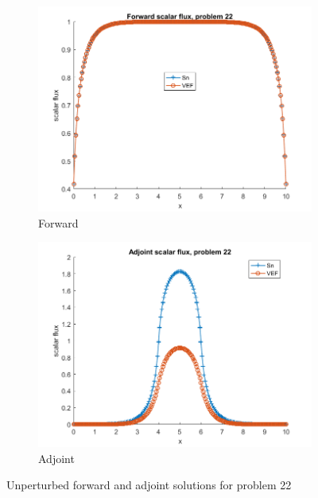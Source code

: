 \documentclass{article}
\begin{document}
\begin{figure}[H]
\centering
\begin{subfigure}{.5\textwidth}
  \centering
  \includegraphics[width=1\linewidth]{p22f.png}
  \caption{Forward}
  \label{fig:sub1}
\end{subfigure}%
\begin{subfigure}{.5\textwidth}
  \centering
  \includegraphics[width=1\linewidth]{p22a.png}
  \caption{Adjoint}
  \label{fig:sub2}
\end{subfigure}
\caption{Unperturbed forward and adjoint solutions for problem 22}
\label{fig:test}
\end{figure}
\end{document}
